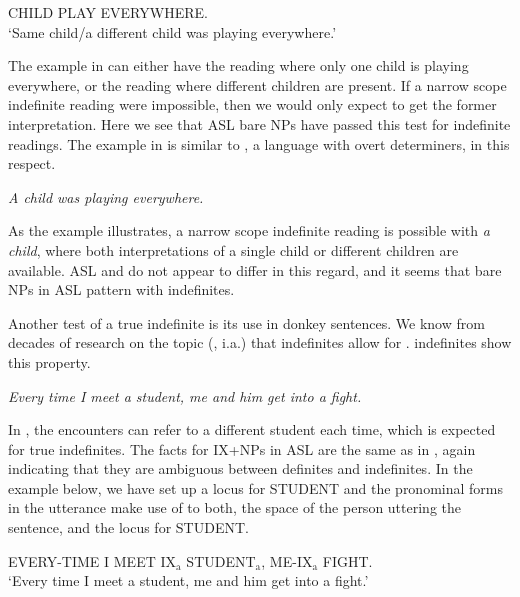 \documentclass[output=paper,
modfonts
]{langscibook}
\begin{document}
\begin{exe} 
\ex \label{ex:irani:38} CHILD PLAY EVERYWHERE.\\
`Same child/a different child was playing everywhere.’
\end{exe} 

The example in  can either have the reading where only one child is playing everywhere, or the reading where different children are present. If a narrow scope indefinite reading were impossible, then we would only expect to get the former interpretation. Here we see that ASL bare NPs have passed this test for indefinite readings. The example in  is similar to  , a language with overt determiners, in this respect. 

\begin{exe}
\ex \label{ex:irani:39} \textit{A child was playing everywhere.}
\end{exe}

As the  example illustrates, a narrow scope indefinite reading is possible with \textit{a child}, where both interpretations of a single child or different children are available. ASL and  do not appear to differ in this regard, and it seems that bare NPs in ASL pattern with  indefinites. 

Another test of a true indefinite is its use in donkey sentences. We know from decades of research on the topic (\citealt{Geach1962,Lewis1975}, i.a.) that indefinites allow for .  indefinites show this property. 

\begin{exe}
\ex \label{ex:irani:40} \textit{Every time I meet a student, me and him get into a fight.}
\end{exe}

In , the encounters can refer to a different student each time, which is expected for true indefinites. The facts for IX+NPs in ASL are the same as in , again indicating that they are ambiguous between definites and indefinites. In the example below, we have set up a locus for STUDENT and the pronominal forms in the utterance make use of  to both, the space of the person uttering the sentence, and the locus for STUDENT.

\begin{exe}
\ex \label{ex:irani:41} EVERY-TIME I MEET IX$_\text{a}$ STUDENT$_\text{a}$, ME-IX$_\text{a}$ FIGHT.\\
`Every time I meet a student, me and him get into a fight.'
\end{exe}
\end{document}
